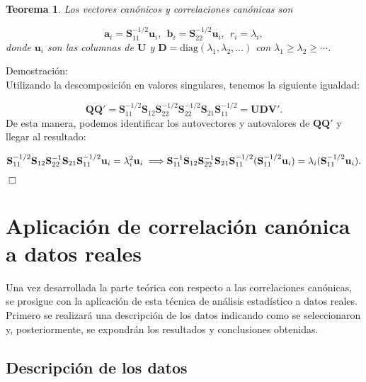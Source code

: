 \documentclass[tfg,cienciasbased,lot,lof,covers,final,overleaf,nocopyright]{tfgtfmthesisuam}
\newtheorem{teor}{Teorema}[chapter]
\begin{document}
\begin{teor}
    Los vectores canónicos y correlaciones canónicas son
    
    \begin{equation*}
        \mathbf{a}_i = \mathbf{S}_{11}^{-1/2}\mathbf{u}_i,\ \  \mathbf{b}_i = \mathbf{S}_{22}^{-1/2}\mathbf{u}_i,\ \  r_i = \lambda_i,
    \end{equation*}
    donde $\mathbf{u}_i$ son las columnas de $\mathbf{U}$ y $\mathbf{D} = \mbox{diag}(\lambda_1, \lambda_2, \ldots)$ con $\lambda_1 \geq \lambda_2 \geq \cdots$.
\end{teor}
Demostración:\\
Utilizando la descomposición en valores singulares, tenemos la siguiente igualdad:

\begin{equation*}
    \mathbf{QQ}' = \mathbf{S}_{11}^{-1/2}\mathbf{S}_{12}\mathbf{S}_{22}^{-1/2}\mathbf{S}_{22}^{-1/2}\mathbf{S}_{21}\mathbf{S}_{11}^{-1/2} = \mathbf{UDV}'.
\end{equation*}
De esta manera, podemos identificar los autovectores y autovalores de $\mathbf{QQ}'$ y llegar al resultado:

\begin{equation*}
    \mathbf{S}_{11}^{-1/2}\mathbf{S}_{12}\mathbf{S}_{22}^{-1}\mathbf{S}_{21}\mathbf{S}_{11}^{-1/2}\mathbf{u}_i = \lambda_i^2\mathbf{u}_i \implies \\
    \mathbf{S}_{11}^{-1}\mathbf{S}_{12}\mathbf{S}_{22}^{-1}\mathbf{S}_{21}\mathbf{S}_{11}^{-1/2}(\mathbf{S}_{11}^{-1/2}\mathbf{u}_i) = \lambda_i(\mathbf{S}_{11}^{-1/2}\mathbf{u}_i).
\end{equation*}
\begin{flushright}$\Box$\end{flushright}

\section{Aplicación de correlación canónica a datos reales}

Una vez desarrollada la parte teórica con respecto a las correlaciones canónicas, se prosigue con la aplicación de esta técnica de análisis estadístico a datos reales. Primero se realizará una descripción de los datos indicando como se seleccionaron y, posteriormente, se expondrán los resultados y conclusiones obtenidas.

\subsection{Descripción de los datos}
\end{document}
